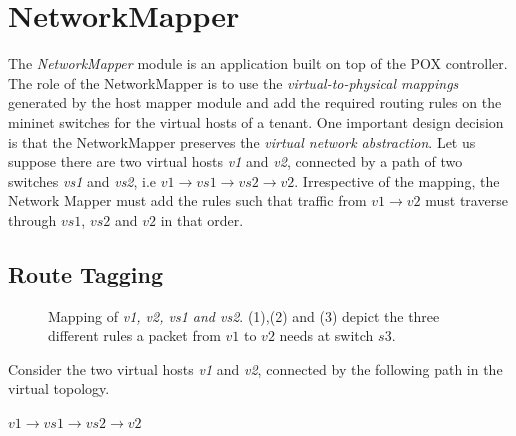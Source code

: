 \section{NetworkMapper}
The \emph{NetworkMapper} module is an application built on top of the POX controller. The role of the NetworkMapper is to use the \emph{virtual-to-physical mappings} generated by the host mapper module and add the required routing rules on the mininet switches for the virtual hosts of a tenant. One important design decision is that the NetworkMapper preserves the \emph{virtual network abstraction}. Let us suppose there are two virtual hosts \emph{v1} and \emph{v2}, connected by a path of two switches \emph{vs1} and \emph{vs2}, i.e $v1 \rightarrow vs1 \rightarrow vs2 \rightarrow v2 $.  Irrespective of the mapping, the Network Mapper must add the rules such that traffic from $v1 \rightarrow v2 $ must traverse through $vs1$, $vs2 $ and $v2$ in that order. 

\subsection{Route Tagging}
\begin{figure}
	\noindent
	\caption{Mapping of \emph{v1, v2, vs1 and vs2}. (1),(2) and (3) depict the three different rules a packet from $v1$ to $v2$ needs at switch $s3$.}
\end{figure}
Consider the two virtual hosts \emph{v1} and \emph{v2}, connected by the following path  in the virtual topology.
\begin{center}
	$v1 \rightarrow vs1 \rightarrow vs2 \rightarrow v2 $
\end{center}

